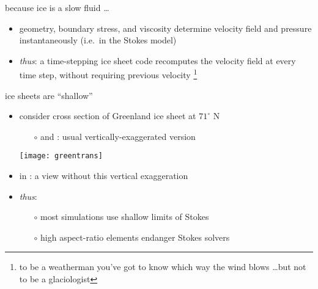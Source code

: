 \documentclass{beamer}
\begin{document}
\begin{frame}{because ice is a slow fluid \dots}

\begin{itemize}
\item  geometry, boundary stress, and viscosity determine velocity field and pressure instantaneously (i.e.~in the Stokes model)

\bigskip
\item \emph{thus}: a time-stepping ice sheet code recomputes the velocity field at every time step, without requiring previous velocity \footnote{to be a weatherman you've got to know which way the wind blows \dots but not to be a glaciologist}
\end{itemize}
\end{frame}


\begin{frame}{ice sheets are ``shallow''}

\begin{itemize}
\item consider cross section of Greenland ice sheet at $71^\circ$ N
\small
  \begin{itemize}
  \item[$\circ$] {\color{dark green}{green}} and {\color{dark blue}{blue}}: usual vertically-exaggerated version
  \end{itemize}
  \begin{center}
    \texttt{[image: greentrans]}
  \end{center}
\normalsize
\item in {\color{dark red}{red}}: a view without this vertical exaggeration
\item \emph{thus}: 
  \begin{itemize}
  \item[$\circ$] most simulations use shallow limits of Stokes
  \item[$\circ$] high aspect-ratio elements endanger Stokes solvers
  \end{itemize}
\end{itemize}
\end{frame}
\end{document}
